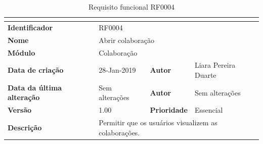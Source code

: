     \begin{table}[H]
        \caption{Requisito funcional RF0004}
        \begin{tabular}{llll}
        \hline
        \textbf{} &  &  &  \\ \hline
        \multicolumn{1}{|l|}{\textbf{Identificador}} & \multicolumn{3}{l|}{RF0004} \\ \hline
        \multicolumn{1}{|l|}{\textbf{Nome}} & \multicolumn{3}{l|}{Abrir colaboração} \\ \hline
        \multicolumn{1}{|l|}{\textbf{Módulo}} & \multicolumn{3}{l|}{Colaboração} \\ \hline
        \multicolumn{1}{|l|}{\textbf{Data de criação}} & \multicolumn{1}{l|}{28-Jan-2019} & \multicolumn{1}{l|}{\textbf{Autor}} & \multicolumn{1}{l|}{Liara Pereira Duarte} \\ \hline
        \multicolumn{1}{|l|}{\textbf{Data da última alteração}} & \multicolumn{1}{l|}{Sem alterações} & \multicolumn{1}{l|}{\textbf{Autor}} & \multicolumn{1}{l|}{Sem alterações} \\ \hline
        \multicolumn{1}{|l|}{\textbf{Versão}} & \multicolumn{1}{l|}{1.00} & \multicolumn{1}{l|}{\textbf{Prioridade}} & \multicolumn{1}{l|}{Essencial} \\ \hline
        \multicolumn{1}{|l|}{\textbf{Descrição}} & \multicolumn{3}{l|}{Permitir que os usuários visualizem as colaborações.} \\ \hline
        \end{tabular}
        \label{tab:RF0004}
    \end{table}
    
